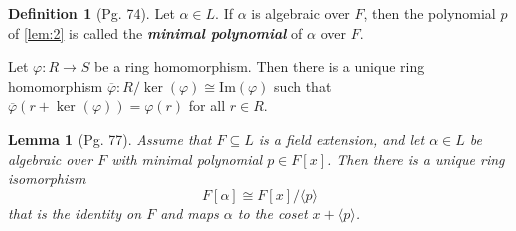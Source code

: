 \documentclass[leqno]{article}
\newenvironment{customthm}[1]
  {\renewcommand\theinnercustomthm{#1}\innercustomthm}
  {\endinnercustomthm}
\newtheorem{lemma}{Lemma}
\theoremstyle{definition}
\newtheorem{definition}{Definition}
\theoremstyle{remark}
\theoremstyle{definition}
\begin{document}
    \begin{definition}[Pg. 74]\label{def:3}
        Let $\alpha\in L$. If $\alpha$ is algebraic over $F$, then the polynomial $p$ of \cref{lem:2} is called the \textbf{\textit{minimal polynomial}} of $\alpha$ over $F$.
    \end{definition}
    \begin{customthm}{A}[Pg. 514]\label{thm:A}
        Let $\varphi\colon R\rightarrow S$ be a ring homomorphism. Then there is a unique ring homomorphism $\overline{\varphi}\colon R/\ker(\varphi)\cong\text{Im}(\varphi)$ such that $\overline{\varphi}(r+\ker(\varphi))=\varphi(r)$ for all $r\in R$.
    \end{customthm}
    \begin{lemma}[Pg. 77]\label{lem:3}
        Assume that $F\subseteq L$ is a field extension, and let $\alpha\in L$ be algebraic over $F$ with minimal polynomial $p\in F[x]$. Then there is a unique ring isomorphism
            \begin{equation*}
                F[\alpha]\cong F[x]/\langle p\rangle
            \end{equation*}
        that is the identity on $F$ and maps $\alpha$ to the coset $x+\langle p\rangle$.
    \end{lemma}
\end{document}

